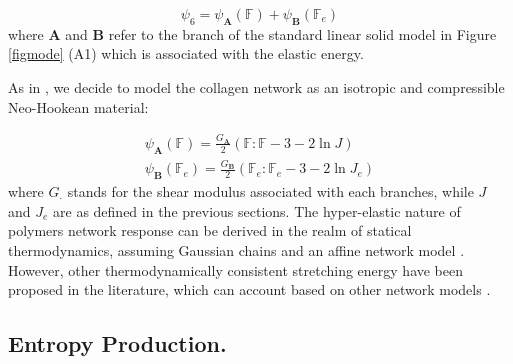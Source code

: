 \documentclass[runningheads]{llncs}
\newcommand{\F}{\ensuremath{\mathbb{F}}}
\begin{document}
\begin{equation}
\psi_6 = \psi_\mathbf{A}(\F) + \psi_\mathbf{B}(\F_e)
\end{equation}
where $\mathbf{A}$ and $\mathbf{B}$ refer to the branch of the standard linear solid model in Figure \ref{figmode} (A1) which is associated with the elastic energy.

As in \cite{ecm2}, we decide to model the collagen network as an isotropic and compressible Neo-Hookean material:

\begin{eqnarray}
\psi_\mathbf{A}(\F) = \frac{G_\mathbf{A}}{2} \left(\F:\F - 3 -2 \ln J\right)\\
\psi_\mathbf{B}(\F_e) = \frac{G_\mathbf{B}}{2} \left(\F_e:\F_e - 3 -2 \ln J_{e}\right)
\end{eqnarray}
where $G_\mathbf{\cdot}$ stands for the shear modulus associated with each branches, while $J$ and $J_e$ are as defined in the previous sections. The hyper-elastic nature of polymers network response can be derived in the realm of statical thermodynamics, assuming Gaussian chains and an affine network model \cite{floryprinciples}. However, other thermodynamically consistent stretching energy have been proposed in the literature, which can account based on other network models \cite{BERGSTROM1998931,boyce2,doi}.

\subsection{Entropy Production.}
\newpage


%
\end{document}
